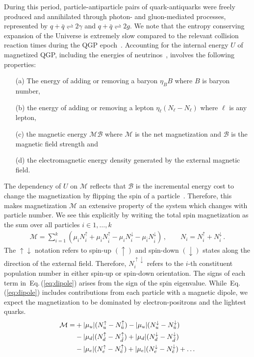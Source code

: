 \documentclass[epjST]{svjour}
\newcommand{\req}[1]{Eq.\,(\ref{#1})}
\begin{document}
During this period, particle-antiparticle pairs of quark-antiquarks were freely produced and annihilated through photon- and gluon-mediated processes, represented by \(q+\bar{q}\rightleftharpoons2\gamma\) and \(q+\bar{q}\rightleftharpoons2g\). We note that the entropy conserving expansion of the Universe is extremely slow compared to the relevant collision reaction times during the QGP epoch~\cite{Yang:2024ret}. Accounting for the internal energy $U$ of magnetized QGP, including the energies of neutrinos~\cite{Birrell:2014ona}, involves the following properties: 
\begin{itemize}
\item[(a)] The energy of adding or removing a baryon $\eta_{B}B$ where \(B\) is baryon number,
\item[(b)] the energy of adding or removing a lepton $\eta_{\ell}(N_{\ell}-N_{\ell})$ where $\ell$ is any lepton, 
\item[(c)] the magnetic energy $\mathcal{M}\mathcal{B}$ where $\mathcal{M}$ is the net magnetization and $\mathcal{B}$ is the magnetic field strength and
\item[(d)] the electromagnetic energy density generated by the external magnetic field.
\end{itemize}

The dependency of $U$ on $\mathcal{M}$ reflects that $\mathcal{B}$ is the incremental energy cost to change the magnetization by flipping the spin of a particle~\cite{Bali:2014kia}. Therefore, this makes magnetization $\mathcal{M}$ an extensive property of the system which changes with particle number. We see this explicitly by writing the total spin magnetization as the sum over all particles $i\in{1,\ldots,k}$
\begin{align}
\label{eq:dipole}
\mathcal{M} = \sum_{i=1}^{k}(\mu_{i}N_{i}^{\uparrow} + \mu_{\bar{i}}N_{\bar{i}}^{\uparrow} - \mu_{i}N_{i}^{\downarrow} - \mu_{\bar{i}}N_{\bar{i}}^{\downarrow})\,,\qquad
N_{i} = N_{i}^{\uparrow} + N_{i}^{\downarrow}\,.
\end{align}
The $\uparrow\downarrow$ notation refers to spin-up $(\uparrow)$ and spin-down $(\downarrow)$ states along the direction of the external field. Therefore, $N_{i}^{\uparrow\downarrow}$ refers to the $i$-th constituent population number in either spin-up or spin-down orientation. The signs of each term in~\req{eq:dipole} arises from the sign of the spin eigenvalue. While~\req{eq:dipole} includes contributions from each particle with a magnetic dipole, we expect the magnetization to be dominated by electron-positrons and the lightest quarks.
\begin{align}
\notag\mathcal{M} = &+|\mu_{u}|(N_{u}^{\uparrow}-N_{\bar{u}}^{\uparrow})-|\mu_{u}|(N_{u}^{\downarrow}-N_{\bar{u}}^{\downarrow})\\
\notag &-|\mu_{d}|(N_{d}^{\uparrow}-N_{\bar{d}}^{\uparrow})+|\mu_{d}|(N_{d}^{\downarrow}-N_{\bar{d}}^{\downarrow})\\
\label{eq:dipole2}
&-|\mu_{e}|(N_{e}^{\uparrow}-N_{\bar{e}}^{\uparrow})+|\mu_{e}|(N_{e}^{\downarrow}-N_{\bar{e}}^{\downarrow})+\ldots
\end{align}
\end{document}
